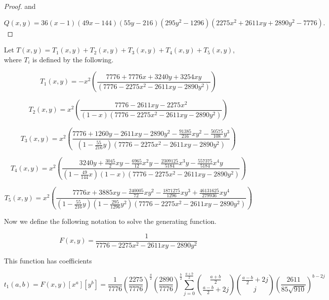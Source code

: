 \documentclass[12pt]{article}
\theoremstyle{plain}
\theoremstyle{definition}
\theoremstyle{remark}
\theoremstyle{definition}
\begin{document}
\begin{landscape}
\begin{proof}
and

$Q(x,y) = 36 (x - 1)(49 x - 144)(55 y - 216)(295 y^{2} - 1296)(2275 x^{2} + 2611 x y + 2890 y^{2} - 7776).
$

\end{proof}

Let $T(x,y) = T_1(x,y) + T_2(x,y) + T_3(x,y) + T_4(x,y) + T_5(x,y)$, where $T_i$ is defined by the following.

\begin{equation}
    T_1(x,y) = -x^2\left(\frac{7776 + 7776x + 3240y + 3254xy}{(7776 - 2275x^2 - 2611xy - 2890y^2)}\right)
\end{equation}

\begin{equation}
    T_2(x,y) = x^2\left(\frac{7776-2611xy-2275x^2}{(1-x)(7776 - 2275x^2 - 2611xy - 2890y^2)}\right)
\end{equation}

\begin{equation}
    T_3(x,y) = x^2\left(\frac{7776+1260y-2611xy-2890y^2-\frac{91385}{216}xy^2 - \frac{50575}{108}y^3}{(1-\frac{55}{216}y)(7776 - 2275x^2 - 2611xy - 2890y^2)}\right)
\end{equation}

\begin{equation}
    T_4(x,y) = x^2\left(\frac{3240y + \frac{3045}{2} xy - \frac{6965}{12} x^{2} y - \frac{2309125}{5184} x^{3} y - \frac{557375}{5184} x^{4} y}{(1-\frac{49}{144}x)(1-x)(7776 - 2275x^2 - 2611xy - 2890y^2)}\right)
\end{equation}

\begin{equation}
    T_5(x,y) = x^2\left(\frac{7776 x + 3885 x y - \frac{240005}{72} x y^{2} - \frac{1871275}{1296} x y^{3} + \frac{46131625}{279936} x y^{4}}{(1-\frac{55}{216}y)(1-\frac{295}{1296}y^2)(7776 - 2275x^2 - 2611xy - 2890y^2)}\right)
\end{equation}

Now we define the following notation to solve the generating function.

\begin{equation}
    F(x,y) = \frac{1}{7776-2275x^2-2611xy-2890y^2}
\end{equation}

This function has coefficients 

\begin{equation}
    t_1(a,b) = F(x,y)[x^a][y^b] = \frac{1}{7776} \left(\frac{2275}{7776}\right)^{\frac{a}{2}} \left(\frac{2890}{7776}\right)^{\frac{b}{2}} \sum_{j=0}^{\frac{a+b}{2}}\binom{\frac{a+b}{2}}{\frac{a-b}{2}+2j}\binom{\frac{a-b}{2}+2j}{j}\left(\frac{2611}{85\sqrt{910}}\right)^{b-2j}
\end{equation}


\end{landscape}
\end{document}
